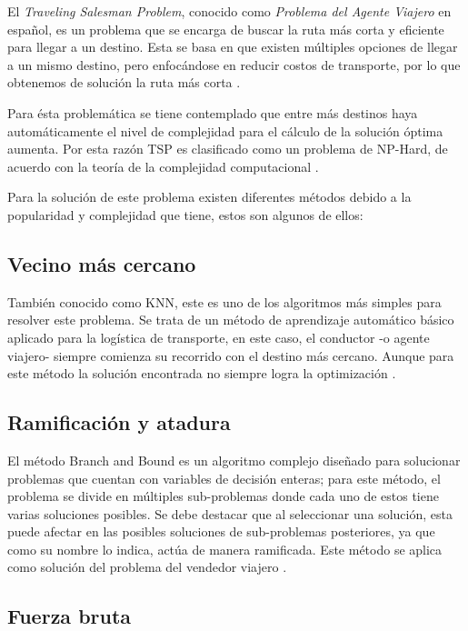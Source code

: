 \documentclass[journal]{IEEEtran}
\begin{document}
        El \emph{Traveling Salesman Problem}, conocido como \emph{Problema del Agente Viajero} en español, es un problema que se encarga de buscar la ruta más corta y eficiente para llegar a un destino. Esta se basa en que existen múltiples opciones de llegar a un mismo destino, pero enfocándose en reducir costos de transporte, por lo que obtenemos de solución la ruta más corta \cite{trevelingProb}.

        Para ésta problemática se tiene contemplado que entre más destinos haya automáticamente el nivel de complejidad para el cálculo de la solución óptima aumenta. Por esta razón TSP es clasificado como un problema de NP-Hard, de acuerdo con la teoría de la complejidad computacional \cite{trevelingProb}.

        Para la solución de este problema existen diferentes métodos debido a la popularidad y complejidad que tiene, estos son algunos de ellos:
        
        \subsection{Vecino más cercano}
        
            También conocido como KNN, este es uno de los algoritmos más simples para resolver este problema. Se trata de un método de aprendizaje automático básico aplicado para la logística de transporte, en este caso, el conductor -o agente viajero- siempre comienza su recorrido con el destino más cercano. Aunque para este método la solución encontrada no siempre logra la optimización \cite{trevelingProb}.

        \subsection{Ramificación y atadura}
        
            El método Branch and Bound es un algoritmo complejo diseñado para solucionar problemas que cuentan con variables de decisión enteras; para este método, el problema se divide en múltiples sub-problemas donde cada uno de estos tiene varias soluciones posibles. Se debe destacar que al seleccionar una solución, esta puede afectar en las posibles soluciones de sub-problemas posteriores, ya que como su nombre lo indica, actúa de manera ramificada. Este método se aplica como solución del problema del vendedor viajero \cite{trevelingProb}.

        \subsection{Fuerza bruta}
        
\end{document}
